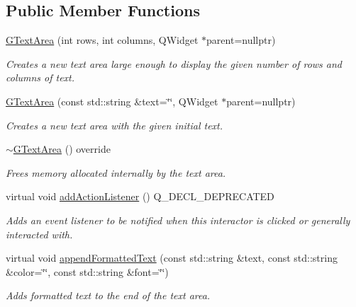 \subsection*{Public Member Functions}
\begin{DoxyCompactItemize}
\item 
\mbox{\hyperlink{classsgl_1_1GTextArea_aad263200ff85ead4d5e4d013c95c3107}{G\+Text\+Area}} (int rows, int columns, Q\+Widget $\ast$parent=nullptr)
\begin{DoxyCompactList}\small\item\em Creates a new text area large enough to display the given number of rows and columns of text. \end{DoxyCompactList}\item 
\mbox{\hyperlink{classsgl_1_1GTextArea_a0902cdcc62cad5c1c81fc74ce38d8b13}{G\+Text\+Area}} (const std\+::string \&text=\char`\"{}\char`\"{}, Q\+Widget $\ast$parent=nullptr)
\begin{DoxyCompactList}\small\item\em Creates a new text area with the given initial text. \end{DoxyCompactList}\item 
\mbox{\hyperlink{classsgl_1_1GTextArea_a7175406f7376c3e97ea921a39c175daf}{$\sim$\+G\+Text\+Area}} () override
\begin{DoxyCompactList}\small\item\em Frees memory allocated internally by the text area. \end{DoxyCompactList}\item 
virtual void \mbox{\hyperlink{classsgl_1_1GInteractor_a02f20ea6edfa0671f31c4c648a253833}{add\+Action\+Listener}} () Q\+\_\+\+D\+E\+C\+L\+\_\+\+D\+E\+P\+R\+E\+C\+A\+T\+ED
\begin{DoxyCompactList}\small\item\em Adds an event listener to be notified when this interactor is clicked or generally interacted with. \end{DoxyCompactList}\item 
virtual void \mbox{\hyperlink{classsgl_1_1GTextArea_ac7d00bfb7f87912fd664b97f29cc71e9}{append\+Formatted\+Text}} (const std\+::string \&text, const std\+::string \&color=\char`\"{}\char`\"{}, const std\+::string \&font=\char`\"{}\char`\"{})
\begin{DoxyCompactList}\small\item\em Adds formatted text to the end of the text area. \end{DoxyCompactList}\item 

\end{DoxyCompactItemize}
